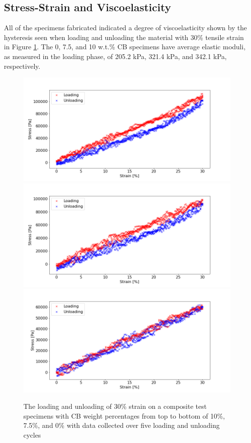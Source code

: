\subsection{Stress-Strain and Viscoelasticity}
All of the specimens fabricated indicated a degree of viscoelasticity shown by the hysteresis seen when loading and unloading the material with 30\% tensile strain in Figure \ref{fig:loading-and-unloading-specimens}. The 0, 7.5, and 10 w.t.\% CB specimens have average elastic moduli, as measured in the loading phase, of 205.2 kPa, 321.4 kPa, and 342.1 kPa, respectively.
\begin{figure}[H]
	\centering
	\includegraphics[width=0.69\linewidth]{Figures/load_unload_1_10_E4pin_20mm_v9_0.3Strain.png}
	\includegraphics[width=0.69\linewidth]{Figures/load_unload_2_7-5_E4pin_20mm_v10_0.3Strain.png}
	\includegraphics[width=0.69\linewidth]{Figures/load_unload_1_CB0_v1_0.3Strain.png}
	\caption{The loading and unloading of 30\% strain on a composite test specimens with CB weight percentages from top to bottom of 10\%, 7.5\%, and 0\% with data collected over five loading and unloading cycles}
	\label{fig:loading-and-unloading-specimens}
\end{figure}


